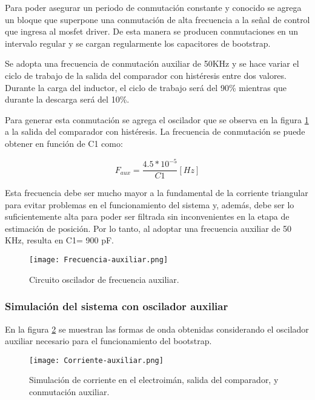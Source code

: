 \noindent Para poder asegurar un periodo de conmutación constante y conocido se agrega un bloque que superpone una conmutación de alta frecuencia a la señal de control que ingresa al mosfet driver. De esta manera se producen conmutaciones en un intervalo regular y se cargan regularmente los capacitores de bootstrap. 

\noindent Se adopta una frecuencia de conmutación auxiliar de 50KHz y se hace variar el ciclo de trabajo de la salida del comparador con histéresis entre dos valores. Durante la carga del inductor, el ciclo de trabajo será del 90\% mientras que durante la descarga será del 10\%.

\noindent Para generar esta conmutación se agrega el oscilador que se observa en la figura \ref{fig:img_frecuencia-auxiliar} a la salida del comparador con histéresis. La frecuencia de conmutación se puede obtener en función de C1 como:

\begin{equation} 
	F_{aux} = \frac{4.5*10^{-5}}{C1} [Hz]
\end{equation}


\noindent Esta frecuencia debe ser mucho mayor a la fundamental de la corriente triangular para evitar problemas en el funcionamiento del sistema y, además, debe ser lo suficientemente alta para poder ser filtrada sin inconvenientes en la etapa de estimación de posición. Por lo tanto, al adoptar una frecuencia auxiliar de 50 KHz, resulta en C1= 900 pF.

\begin{figure}[H]
	\centering
	\texttt{[image: Frecuencia-auxiliar.png]}
	\caption{Circuito oscilador de frecuencia auxiliar.}
	\label{fig:img_frecuencia-auxiliar}
\end{figure}


\subsubsection{Simulación del sistema con oscilador auxiliar}

\noindent En la figura \ref{fig:img_corriente-auxiliar} se muestran las formas de onda obtenidas considerando el oscilador auxiliar necesario para el funcionamiento del bootstrap. 

\begin{figure}[H]
	\centering
	\texttt{[image: Corriente-auxiliar.png]}
	\caption{Simulación de corriente en el electroimán, salida del comparador, y conmutación auxiliar.}
	\label{fig:img_corriente-auxiliar}
\end{figure}

